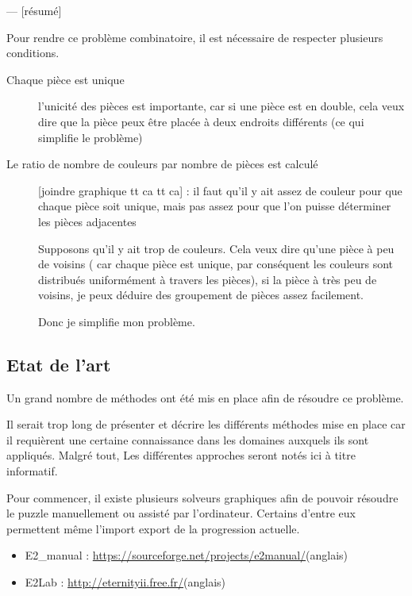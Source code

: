 	
	--- [résumé]
	
	Pour rendre ce problème combinatoire, il est nécessaire de respecter plusieurs conditions.
	
	\begin{description}
		\item[Chaque pièce est unique] l'unicité des pièces est importante, car si une pièce est en double, cela veux dire que la pièce peux être placée à deux endroits différents (ce qui simplifie le problème)
		\item[Le ratio de nombre de couleurs par nombre de pièces est calculé] [joindre graphique tt ca tt ca] : il faut qu'il y ait assez de couleur pour que chaque pièce soit unique, mais pas assez pour que l'on puisse déterminer les pièces adjacentes
		
		\begin{exmp}
			Supposons qu'il y ait trop de couleurs. Cela veux dire qu'une pièce à peu de voisins ( car chaque pièce est unique, par conséquent les couleurs sont distribués uniformément à travers les pièces), si la pièce à très peu de voisins, je peux déduire des groupement de pièces assez facilement.
			
			Donc je simplifie mon problème.
		\end{exmp}		
	\end{description}
	
	\subsection{Etat de l'art}
	
	Un grand nombre de méthodes ont été mis en place afin de résoudre ce problème.
	
	Il serait trop long de présenter et décrire les différents méthodes mise en place car il requièrent une certaine connaissance dans les domaines auxquels ils sont appliqués. Malgré tout, Les différentes approches seront notés ici à titre informatif.
	
	Pour commencer, il existe plusieurs solveurs graphiques afin de pouvoir résoudre le puzzle manuellement ou assisté par l'ordinateur. Certains d'entre eux permettent même l'import export de la progression actuelle.
	
	\begin{itemize}
		\item E2\_manual : \url{https://sourceforge.net/projects/e2manual/}(anglais)
		\item E2Lab : \url{http://eternityii.free.fr/}(anglais)
	\end{itemize}
	
